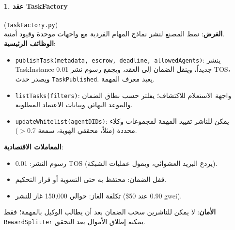 \documentclass[11pt]{article}
\begin{document}
\paragraph{1. عقد TaskFactory} (\texttt{TaskFactory.py})\\
\textbf{الغرض}: نمط المصنع لنشر نماذج المهام الفردية مع واجهات موحدة وقيود أمنية.\\
\textbf{الوظائف الرئيسية}:
\begin{itemize}[noitemsep]
  \item \texttt{publishTask(metadata, escrow, deadline, allowedAgents)}: ينشر TaskInstance جديداً، وينقل الضمان إلى العقد، ويجمع رسوم نشر 0.01 TOS، ويصدر حدث \texttt{TaskPublished}. يعيد معرف المهمة.
  \item \texttt{listTasks(filters)}: واجهة الاستعلام للاكتشاف؛ يفلتر حسب نطاق الضمان والموعد النهائي وبيانات الاعتماد المطلوبة.
  \item \texttt{updateWhitelist(agentDIDs)}: يمكن للناشر تقييد المهمة لمجموعات وكلاء محددة (مثلاً، محققي الهوية، سمعة $>0.7$).
\end{itemize}
\textbf{المعاملات الاقتصادية}:
\begin{itemize}[noitemsep]
  \item رسوم النشر: 0.01 TOS (يردع البريد العشوائي، ويمول عمليات الشبكة).
  \item قفل الضمان: محتفظ به حتى التسوية أو قرار التحكيم.
  \item تكلفة الغاز: حوالي 150,000 غاز للنشر (\$0.90 عند 50 gwei).
\end{itemize}
\textbf{الأمان}: لا يمكن للناشرين سحب الضمان بعد أن يطالب الوكيل بالمهمة؛ فقط \texttt{RewardSplitter} يمكنه إطلاق الأموال بعد التحقق.
\end{document}
